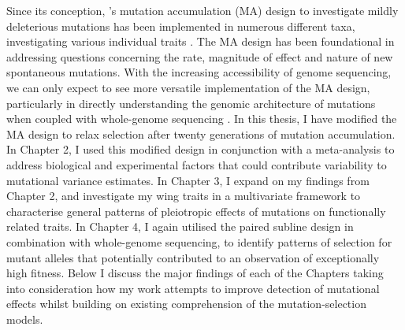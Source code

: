 Since its conception, \citet{Muka64}’s mutation accumulation (MA) design to investigate mildly deleterious mutations has been implemented in numerous different taxa, investigating various individual traits \citep{Houl96, Hall09, Wals18c12}. The MA design has been foundational in addressing questions concerning the rate, magnitude of effect and nature of new spontaneous mutations. With the increasing accessibility of genome sequencing, we can only expect to see more versatile implementation of the MA design, particularly in directly understanding the genomic architecture of mutations when coupled with whole-genome sequencing \citep{Katj19}. In this thesis, I have modified the MA design to relax selection after twenty generations of mutation accumulation. In Chapter 2, I used this modified design in conjunction with a meta-analysis to address biological and experimental factors that could contribute variability to mutational variance estimates. In Chapter 3, I expand on my findings from Chapter 2, and investigate my wing traits in a multivariate framework to characterise general patterns of pleiotropic effects of mutations on functionally related traits. In Chapter 4, I again utilised the paired subline design in combination with whole-genome sequencing, to identify patterns of selection for mutant alleles that potentially contributed to an observation of exceptionally high fitness. Below I discuss the major findings of each of the Chapters taking into consideration how my work attempts to improve detection of mutational effects whilst building on existing comprehension of the mutation-selection models. \par

